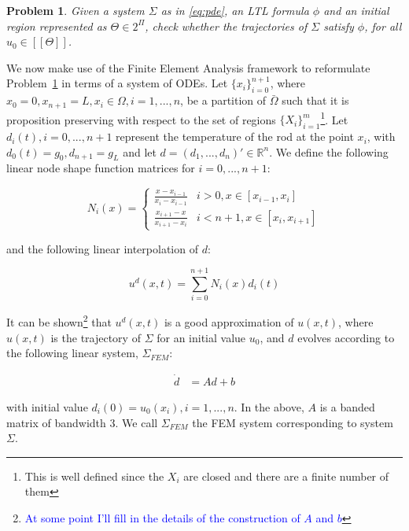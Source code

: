 \documentclass{article}
\newtheorem{problem}{Problem}
\newcommand*{\R}{\mathbb{R}}
\newcommand*{\psat}[1]{[[#1]]}
\newcommand*{\fran}[1]{\textcolor{blue}{#1}}
\begin{document}
\begin{problem}\label{pr:pde}
    Given a system $\Sigma$ as in \eqref{eq:pde}, an LTL formula $\phi$ and an
    initial region represented as $\Theta \in 2^\Pi$, check whether the trajectories of $\Sigma$
    satisfy $\phi$, for all $u_0 \in \psat{\Theta}$.
\end{problem}

We now make use of the Finite Element Analysis framework to reformulate
Problem~\ref{pr:pde} in terms of a system of ODEs. Let $\{x_i\}_{i = 0}^{n +
1}$, where $x_0 = 0, x_{n+1} = L, x_i \in \Omega, i = 1,...,n$, be a partition of
$\bar\Omega$ such that it is proposition preserving with respect to the set of
regions $\{X_i\}_{i = 1}^{m}$\footnote{This is well defined since the $X_i$ are
closed and there are a finite number of them}. Let $d_i(t), i = 0,...,n+1$ represent the
temperature of the rod at the point $x_i$, with $d_0(t) = g_0, d_{n+1} = g_L$ and let $d = (d_1, ..., d_n)' \in
\R^n$. We define the following linear node shape function matrices for $i =
0,...,n+1$:

\begin{equation}
    N_i(x) = \begin{cases}
        \frac{x - x_{i - 1}}{x_i - x_{i - 1}} & i > 0, x \in [x_{i-1}, x_i] \\
        \frac{x_{i+1} - x}{x_{i+1} - x_{i}} & i < n+1, x \in [x_{i}, x_{i+1}] 
    \end{cases} 
\end{equation}

and the following linear interpolation of $d$:

\begin{equation}
    u^d(x, t) = \sum_{i=0}^{n+1} N_i(x) d_i(t)
\end{equation}

It can be shown\footnote{\fran{At some point I'll fill in the details of the
construction of $A$ and $b$}} that $u^d(x, t)$ is a good approximation of 
$u(x, t)$, where $u(x,t)$ is the trajectory of $\Sigma$ for an
initial value $u_0$, and $d$ evolves
according to the following linear system, $\Sigma_{FEM}$:

\begin{equation}\label{eq:fem}
    \begin{aligned}
        \dot{d} &= A d + b
    \end{aligned}
\end{equation}

with initial value $d_i(0) = u_0(x_i), i = 1,...,n$. In the above, $A$ is a
banded matrix of bandwidth 3. We call $\Sigma_{FEM}$ the FEM system
corresponding to system $\Sigma$.
\end{document}
